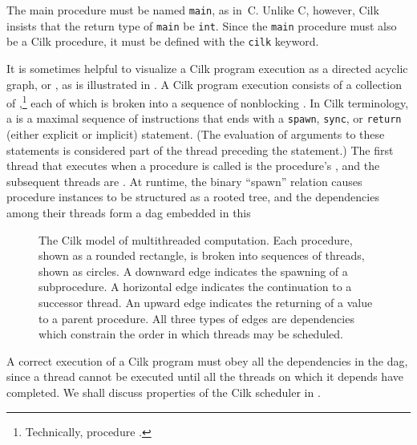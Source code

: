 The main procedure must be named \texttt{main}, as in~C\@.  Unlike C,
however, Cilk insists that the return type of \texttt{main} be
\texttt{int}.  Since the \texttt{main} procedure must also be a Cilk
procedure, it must be defined with the \texttt{cilk} keyword.

It is sometimes helpful to visualize a Cilk program execution as a
directed acyclic graph, or , as is illustrated in
.  A Cilk program
execution consists of a collection of
,\footnote{Technically, procedure .}
each of which is broken into a sequence of nonblocking .
In Cilk terminology, a  is a maximal sequence of
instructions that ends with a \texttt{spawn}, \texttt{sync}, or
\texttt{return} (either explicit or implicit) statement.  (The
evaluation of arguments to these statements is considered part of the
thread preceding the statement.)  The first thread that executes when
a procedure is called is the procedure's , and the
subsequent threads are .  At
runtime, the binary ``spawn'' relation causes procedure instances to
be structured as a rooted tree, and the dependencies among their
threads form a dag embedded in this 
 

\begin{figure}
\centerline{}
\caption{\small The Cilk model of multithreaded computation.  Each
procedure, shown as a rounded rectangle, is broken into sequences of
threads, shown as circles.  A downward edge indicates the spawning of
a subprocedure.  A horizontal edge indicates the continuation to a
successor thread.  An upward edge indicates the returning of a value
to a parent procedure.  All three types of edges are dependencies
which constrain the order in which threads may be scheduled.}
\label{fig:model}
\end{figure}

A correct execution of a Cilk program must obey all the dependencies
in the dag, since a thread cannot be executed until all the threads on
which it depends have completed.  We shall discuss properties of the
Cilk scheduler in .

